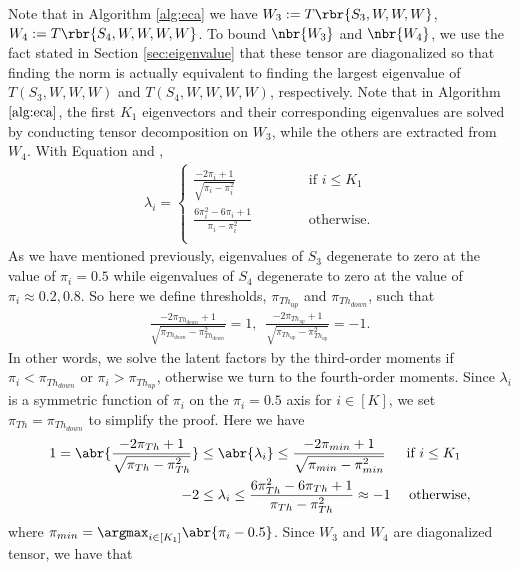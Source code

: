 \documentclass[twoside,11pt]{article}
\begin{document}
{Note that in Algorithm \ref{alg:eca} we have $W_3:= T\rbr{S_3,W,W,W}$, $W_4:= T\rbr{S_4,W,W,W,W}$. To bound $\nbr{W_3}$ and $\nbr{W_4}$, we use the fact stated in Section \ref{sec:eigenvalue} that these tensor are diagonalized so that finding the norm is actually equivalent to finding the largest eigenvalue of $T(S_3, W, W, W)$ and $T(S_4, W, W, W, W)$, respectively. Note that in Algorithm $\ref{alg:eca}$, the first $K_1$ eigenvectors and their corresponding eigenvalues are solved by conducting tensor decomposition on $W_3$, while the others are extracted from $W_4$. With Equation  and , 
  \begin{align}
  \lambda_i = 
    \begin{cases}
      \frac{-2\pi_i+1}{\sqrt{\pi_i-\pi_i^2}}  \quad \phantom{ \frac{6 \pi_i^2-6 \pi_i+1}{\pi_i-\pi_i^2}}\text{if} \,\, i \leq K_1\\
      \frac{6 \pi_i^2-6 \pi_i+1}{\pi_i-\pi_i^2}  \quad \phantom{\frac{-2\pi_i+1}{\sqrt{\pi_i-\pi_i^2}}}\text{otherwise}.
\end{cases}
\end{align}
As we have mentioned previously, eigenvalues of $S_3$ degenerate to zero at the value of $\pi_i = 0.5$ while eigenvalues of $S_4$ degenerate to zero at the value of $\pi_i \approx 0.2, 0.8$. So here we define thresholds, $\pi_{Th_{up}}$ and $\pi_{Th_{down}}$, such that
  \begin{align}
    \frac{-2\pi_{Th_{down}}+1}{\sqrt{\pi_{Th_{down}}-\pi_{Th_{down}}^2}} = 1, \,\,\, \frac{-2\pi_{Th_{up}}+1}{\sqrt{\pi_{Th_{up}}-\pi_{Th_{up}}^2}} = -1.
  \end{align}
In other words, we solve the latent factors by the third-order moments if $\pi_i < \pi_{Th_{down}}$ or $\pi_i >\pi_{Th_{up}}  $, otherwise we turn to the fourth-order moments. Since $\lambda_i$ is a symmetric function of $\pi_i$ on the $\pi_i = 0.5$ axis for $i \in [K]$, we set $\pi_{Th} = \pi_{Th_{down}}$ to simplify the proof. Here we have
  \begin{align}
	1=\abr{\frac{-2\pi_{Th}+1}{\sqrt{\pi_{Th}-\pi_{Th}^2}} }&\leq \abr{\lambda_i } \leq \frac{-2\pi_{min}+1}{\sqrt{\pi_{min}-\pi_{min}^2}} \quad \,\,\, \text{if}\,\,  i \leq K_1\\
         -2  &\leq \lambda_i \leq   \frac{6 \pi_{Th}^2-6 \pi_{Th}+1}{\pi_{Th}-\pi_{Th}^2} \approx -1\quad\,\, \text{otherwise},
  \end{align}
where $\pi_{min} = \argmax_{i \in [K_1]} \abr{\pi_i - 0.5}$. Since $W_3$ and $W_4$ are diagonalized tensor, we have that 
}
\end{document}
